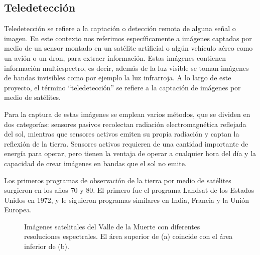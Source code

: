 \subsection{Teledetección}

Teledetección se refiere a la captación o detección remota de alguna señal o imagen. En este contexto nos referimos
específicamente a imágenes captadas por medio de un sensor montado en un satélite artificial o algún vehículo aéreo
como un avión o un dron, para extraer información. Estas imágenes contienen información multiespectro, es decir, además
de la luz visible se toman imágenes de bandas invisibles como por ejemplo la luz infrarroja.
\autocite{globalforestlink-how-sat-imaging-work} A lo largo de este proyecto, el término \enquote{teledetección} se
refiere a la captación de imágenes por medio de satélites.

Para la captura de estas imágenes se emplean varios métodos, que se dividen en dos categorías: sensores pasivos
recolectan radiación electromagnética reflejada del sol, mientras que sensores activos emiten su propia radiación y
captan la reflexión de la tierra. Sensores activos requieren de una cantidad importante de energía para operar, pero
tienen la ventaja de operar a cualquier hora del día y la capacidad de crear imágenes en bandas que el sol no emite.
\autocite{globalforestlink-how-sat-imaging-work}

Los primeros programas de observación de la tierra por medio de satélites surgieron en los años 70 y 80. El primero fue
el programa Landsat de los Estados Unidos en 1972, y le siguieron programas similares en India, Francia y la Unión
Europea. \autocite{esa-space-year-2007}

\begin{figure}
    \centering
    \qquad
    \caption{Imágenes satelitales del Valle de la Muerte con diferentes resoluciones espectrales. El área superior de (a)
    coincide con el área inferior de (b).}
    \label{fig:1}
\end{figure}

